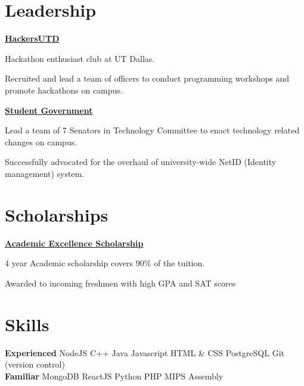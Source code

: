 \documentclass[]{deedy-resume-openfont}
\begin{document}
\begin{minipage}[t]{1.00\textwidth}
\section{Leadership}

\runsubsection \textbf{\href{http://hackersutd.com}{HackersUTD}}
\begin{tightemize}
\item Hackathon enthusiast club at UT Dallas.
\item Recruited and lead a team of officers to conduct programming workshops and promote hackathons on campus.
\end{tightemize}
\sectionsep

\runsubsection \textbf{\href{http://www.utdallas.edu/sg/}{Student Government}}
\begin{tightemize}
\item Lead a team of 7 Senators in Technology Committee to enact technology related changes on campus.
\item Successfully advocated for the overhaul of university-wide NetID (Identity management) system.
\end{tightemize}
\sectionsep

\section{Scholarships}
\runsubsection \textbf{\href{http://www.utdallas.edu/aes/}{Academic Excellence Scholarship}}
\experienceDate{}
\begin{tightemize}
\item 4 year Academic scholarship covers 90\% of the tuition.
\item Awarded to incoming freshmen with high GPA and SAT scores 
\end{tightemize}
\sectionsep

\section{Skills}
\runsubsection \textbf{Experienced}
\experienceDate{}
\textbullet{} NodeJS \textbullet{} C++ \textbullet{} Java \textbullet{} Javascript \textbullet{} HTML \& CSS 
\textbullet{} PostgreSQL \textbullet{} Git (version control) \\
\runsubsection \textbf{Familiar}
\experienceDate{}
\textbullet{} MongoDB \textbullet{} ReactJS \textbullet{} Python \textbullet{} PHP \textbullet{} MIPS Assembly 
\sectionsep


\end{minipage} 
\end{document}
